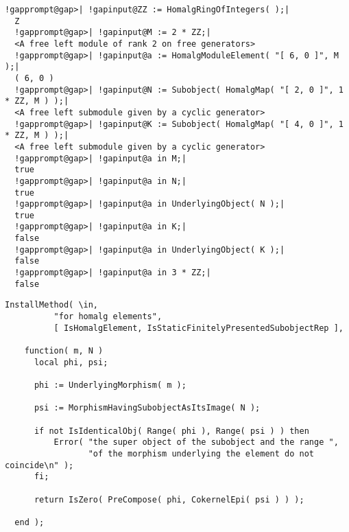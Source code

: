 \documentclass[a4paper,11pt]{report}
\begin{document}
{{{ 
\begin{Verbatim}[commandchars=!@|,fontsize=\small,frame=single,label=Example]
  !gapprompt@gap>| !gapinput@ZZ := HomalgRingOfIntegers( );|
  Z
  !gapprompt@gap>| !gapinput@M := 2 * ZZ;|
  <A free left module of rank 2 on free generators>
  !gapprompt@gap>| !gapinput@a := HomalgModuleElement( "[ 6, 0 ]", M );|
  ( 6, 0 )
  !gapprompt@gap>| !gapinput@N := Subobject( HomalgMap( "[ 2, 0 ]", 1 * ZZ, M ) );|
  <A free left submodule given by a cyclic generator>
  !gapprompt@gap>| !gapinput@K := Subobject( HomalgMap( "[ 4, 0 ]", 1 * ZZ, M ) );|
  <A free left submodule given by a cyclic generator>
  !gapprompt@gap>| !gapinput@a in M;|
  true
  !gapprompt@gap>| !gapinput@a in N;|
  true
  !gapprompt@gap>| !gapinput@a in UnderlyingObject( N );|
  true
  !gapprompt@gap>| !gapinput@a in K;|
  false
  !gapprompt@gap>| !gapinput@a in UnderlyingObject( K );|
  false
  !gapprompt@gap>| !gapinput@a in 3 * ZZ;|
  false 
\end{Verbatim}
 

 
\begin{Verbatim}[fontsize=\small,frame=single,label=Code]
  InstallMethod( \in,
          "for homalg elements",
          [ IsHomalgElement, IsStaticFinitelyPresentedSubobjectRep ],
          
    function( m, N )
      local phi, psi;
      
      phi := UnderlyingMorphism( m );
      
      psi := MorphismHavingSubobjectAsItsImage( N );
      
      if not IsIdenticalObj( Range( phi ), Range( psi ) ) then
          Error( "the super object of the subobject and the range ",
                 "of the morphism underlying the element do not coincide\n" );
      fi;
      
      return IsZero( PreCompose( phi, CokernelEpi( psi ) ) );
      
  end );
\end{Verbatim}
 }

 }

  }

   
\end{document}
